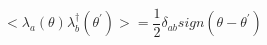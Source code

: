 \begin{equation}
<\lambda_a(\theta)\lambda^\dag_b(\theta^\prime)>=\frac{1}{2}\delta_{a
b}sign(\theta-\theta^\prime)
\end{equation}

